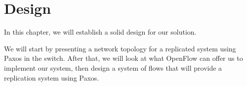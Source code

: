 \chapter{Design}
\label{chapter:design}

In this chapter, we will establish a solid design for our solution.

We will start by presenting a network topology for a replicated system using
Paxos in the switch.  After that, we will look at what OpenFlow can offer us
to implement our system, then design a system of flows that will provide a
replication system using Paxos.




